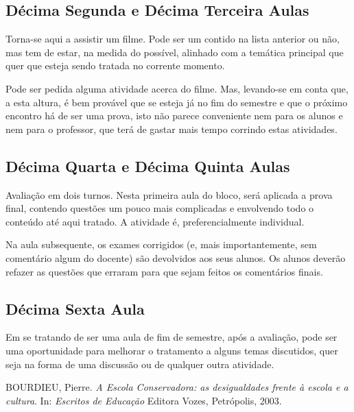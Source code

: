 \documentclass[12pt,a4paper]{article}
\begin{document}
	\subsection*{Décima Segunda e Décima Terceira Aulas}
	
	Torna-se aqui a assistir um filme. Pode ser um contido na 
	lista anterior ou não, mas tem de estar, na medida do possível, 
	alinhado com a temática principal que quer que esteja sendo 
	tratada no corrente momento. 
	
	Pode ser pedida alguma atividade acerca do filme. Mas, 
	levando-se em conta que, a esta altura, é bem provável que se esteja 
	já no fim do semestre e que o próximo encontro há de ser uma prova, 
	isto não parece conveniente nem para os alunos e nem para o professor, 
	que terá de gastar mais tempo corrindo estas atividades. 
	
	\subsection*{Décima Quarta e Décima Quinta Aulas}
	
	Avaliação em dois turnos. Nesta primeira aula do bloco, será aplicada 
	a prova final, contendo questões um pouco mais complicadas e 
	envolvendo todo o conteúdo até aqui tratado. A atividade é, 
	preferencialmente individual. 
	
	Na aula subsequente, os exames corrigidos (e, mais importantemente,  
	sem comentário algum do docente) são devolvidos aos seus alunos. Os 
	alunos deverão refazer as questões que erraram para que sejam 
    feitos os comentários finais. 
	
	\subsection*{Décima Sexta Aula}
	
	Em se tratando de ser uma aula de fim de semestre, após a avaliação, 
	pode ser uma oportunidade para melhorar o tratamento a alguns temas 
	discutidos, quer seja na forma de uma discussão ou de qualquer outra 
	atividade. 



	\newpage
	
	\begin{thebibliography}{9}
		
		BOURDIEU, Pierre. 
		\textit{A Escola Conservadora: as desigualdades 
		frente à escola e a cultura}. 
		In: \textit{Escritos de Educação} 
		Editora Vozes, Petrópolis, 2003.
				

	\end{thebibliography}
	
	
	
\end{document}
